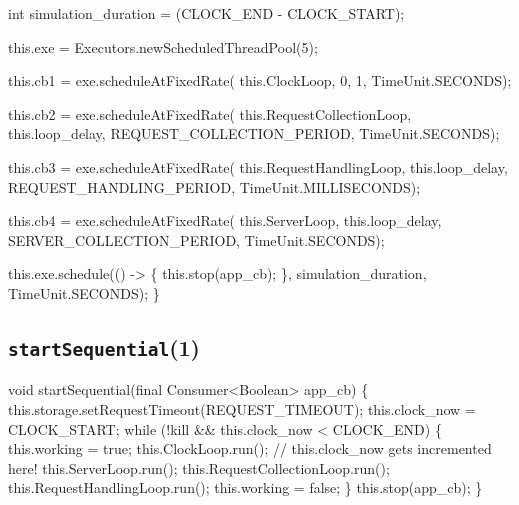   int simulation_duration = (CLOCK_END - CLOCK_START);

  this.exe = Executors.newScheduledThreadPool(5);

  this.cb1 = exe.scheduleAtFixedRate(
    this.ClockLoop, 0, 1, TimeUnit.SECONDS);

  this.cb2 = exe.scheduleAtFixedRate(
    this.RequestCollectionLoop, this.loop_delay, REQUEST_COLLECTION_PERIOD, TimeUnit.SECONDS);

  this.cb3 = exe.scheduleAtFixedRate(
    this.RequestHandlingLoop, this.loop_delay, REQUEST_HANDLING_PERIOD, TimeUnit.MILLISECONDS);

  this.cb4 = exe.scheduleAtFixedRate(
    this.ServerLoop, this.loop_delay, SERVER_COLLECTION_PERIOD, TimeUnit.SECONDS);

  this.exe.schedule(() -> \{
    this.stop(app_cb);
  \}, simulation_duration, TimeUnit.SECONDS);
\}
\eatline
{}\nwendcode{}\nwdocspar
\subsection{\texttt{startSequential}(1)}
\nwenddocs{}\endmoddef{}
void startSequential(final Consumer<Boolean> app_cb) \{
  this.storage.setRequestTimeout(REQUEST_TIMEOUT);
  this.clock_now = CLOCK_START;
  while (!kill && this.clock_now < CLOCK_END) \{
    this.working = true;
    this.ClockLoop.run();  // this.clock_now gets incremented here!
    this.ServerLoop.run();
    this.RequestCollectionLoop.run();
    this.RequestHandlingLoop.run();
    this.working = false;
  \}
  this.stop(app_cb);
\}
\eatline
{}\nwendcode{}\nwdocspar
